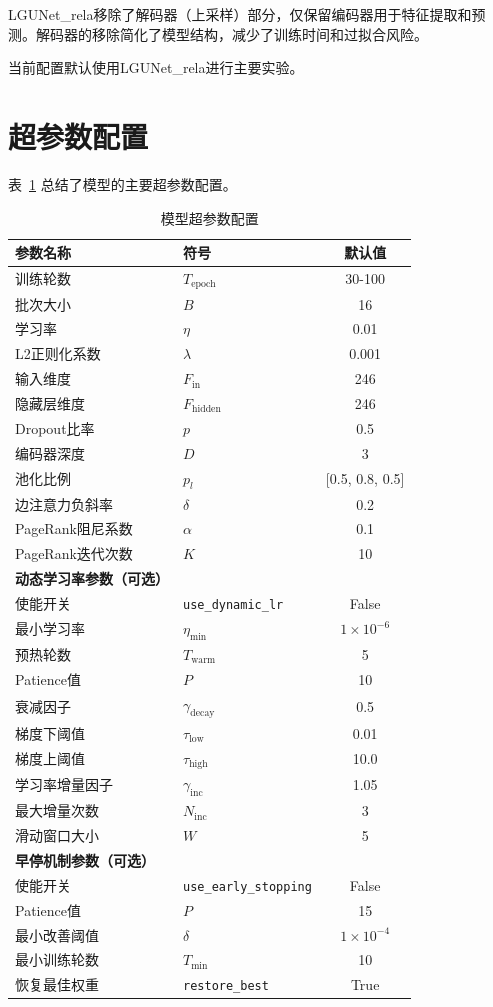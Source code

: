 \documentclass[UTF8, a4paper, 12pt]{article}
\begin{document}
LGUNet\_rela移除了解码器（上采样）部分，仅保留编码器用于特征提取和预测。解码器的移除简化了模型结构，减少了训练时间和过拟合风险。

当前配置默认使用LGUNet\_rela进行主要实验。

\newpage

\section{超参数配置}

表~\ref{tab:hyperparameters} 总结了模型的主要超参数配置。

\begin{table}[htbp]
\centering
\caption{模型超参数配置}
\label{tab:hyperparameters}
\begin{tabular}{llc}
\toprule
参数名称 & 符号 & 默认值 \\
\midrule
训练轮数 & $T_{\text{epoch}}$ & 30-100 \\
批次大小 & $B$ & 16 \\
学习率 & $\eta$ & 0.01 \\
L2正则化系数 & $\lambda$ & 0.001 \\
输入维度 & $F_{\text{in}}$ & 246 \\
隐藏层维度 & $F_{\text{hidden}}$ & 246 \\
Dropout比率 & $p$ & 0.5 \\
编码器深度 & $D$ & 3 \\
池化比例 & $p_l$ & [0.5, 0.8, 0.5] \\
边注意力负斜率 & $\delta$ & 0.2 \\
PageRank阻尼系数 & $\alpha$ & 0.1 \\
PageRank迭代次数 & $K$ & 10 \\
\midrule
\midrule
\textbf{动态学习率参数（可选）} & \textbf{} & \textbf{} \\
使能开关 & \texttt{use\_dynamic\_lr} & False \\
最小学习率 & $\eta_{\text{min}}$ & $1\times10^{-6}$ \\
预热轮数 & $T_{\text{warm}}$ & 5 \\
Patience值 & $P$ & 10 \\
衰减因子 & $\gamma_{\text{decay}}$ & 0.5 \\
梯度下阈值 & $\tau_{\text{low}}$ & 0.01 \\
梯度上阈值 & $\tau_{\text{high}}$ & 10.0 \\
学习率增量因子 & $\gamma_{\text{inc}}$ & 1.05 \\
最大增量次数 & $N_{\text{inc}}$ & 3 \\
滑动窗口大小 & $W$ & 5 \\
\midrule
\midrule
\textbf{早停机制参数（可选）} & \textbf{} & \textbf{} \\
使能开关 & \texttt{use\_early\_stopping} & False \\
Patience值 & $P$ & 15 \\
最小改善阈值 & $\delta$ & $1\times10^{-4}$ \\
最小训练轮数 & $T_{\text{min}}$ & 10 \\
恢复最佳权重 & \texttt{restore\_best} & True \\
\bottomrule
\end{tabular}
\end{table}
\end{document}
